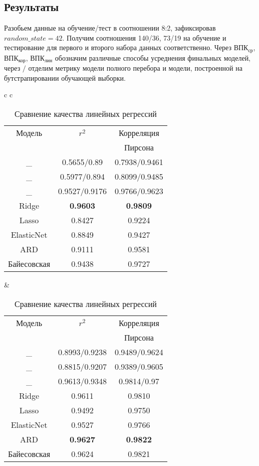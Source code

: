 \documentclass{article}
\begin{document}
\subsection{Результаты}
Разобьем данные на обучение/тест в соотношении 8:2, зафиксировав  $random\_state=42$. Получим соотношения 140/36, 73/19 на обучение и тестирование для первого и второго набора данных соответственно. Через ВПК$_{\text{ср}}$, ВПК$_{\text{кор}}$, ВПК$_{\text{лин}}$ обозначим различные способы усреднения финальных моделей, через $/$ отделим метрику модели полного перебора и модели, построенной на бутстрапировании обучающей выборки.
\begin{center}
\begin{table}[!htb]
\begin{tabular}{c c}
     \begin{tabular}{||c | c | c||}
 \hline
 Модель & $r^2$ & Корреляция
  \\
   & & 
 Пирсона \\[0.5ex] 
 \hline\hline
 \text{ВПК}_{\text{ср}} & 0.5655/0.89 & 0.7938/0.9461 \\ 
 \hline
 \text{ВПК}_{\text{кор}} & 0.5977/0.894 & 0.8099/0.9485 \\ 
 \hline
 \text{ВПК}_{\text{лин}} & 0.9527/0.9176 & 0.9766/0.9623 \\ 
 \hline
 Ridge & \textbf{0.9603} & \textbf{0.9809} \\
 \hline
 Lasso & 0.8427 & 0.9224\\
 \hline
 ElasticNet & 0.8849 & 0.9427  \\
 \hline
 ARD & 0.9111 & 0.9581\\ [1ex] 
 \hline
 Байесовская & 0.9438 & 0.9727 \\
  \hline
\end{tabular} &  

\begin{tabular}{||c | c | c||}
 \hline
 Модель & $r^2$ & Корреляция
  \\
   & & 
 Пирсона \\[0.5ex] 
 \hline\hline
 \text{ВПК}_{\text{ср}} & 0.8993/0.9238 & 0.9489/0.9624 \\ 
 \hline
 \text{ВПК}_{\text{кор}} & 0.8815/0.9207 & 0.9389/0.9605 \\ 
 \hline
 \text{ВПК}_{\text{лин}} & 0.9613/0.9348 & 0.9814/0.97 \\ 
 \hline
 Ridge & 0.9611 & 0.9810 \\
 \hline
 Lasso & 0.9492 & 0.9750 \\
 \hline
 ElasticNet & 0.9527 & 0.9766  \\
 \hline
 ARD & \textbf{0.9627} & \textbf{0.9822}\\ [1ex] 
 \hline
 Байесовская & 0.9624 & 0.9821 \\
  \hline
\end{tabular}
\end{tabular}
\\
\label{tbl: 1}
\caption{Сравнение качества линейных регрессий}
\end{table}
\end{center}
\end{document}
